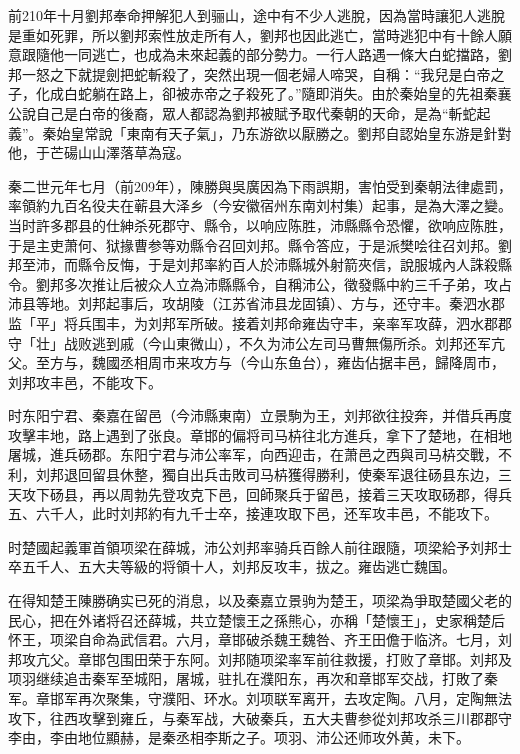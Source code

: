 前210年十月劉邦奉命押解犯人到骊山，途中有不少人逃脫，因為當時讓犯人逃脫是重如死罪，所以劉邦索性放走所有人，劉邦也因此逃亡，當時逃犯中有十餘人願意跟隨他一同逃亡，也成為未來起義的部分勢力。一行人路遇一條大白蛇擋路，劉邦一怒之下就提劍把蛇斬殺了，突然出現一個老婦人啼哭，自稱：“我兒是白帝之子，化成白蛇躺在路上，卻被赤帝之子殺死了。”隨即消失。由於秦始皇的先祖秦襄公說自己是白帝的後裔，眾人都認為劉邦被賦予取代秦朝的天命，是為“斬蛇起義”。秦始皇常說「東南有天子氣」，乃东游欲以厭勝之。劉邦自認始皇东游是針對他，于芒碭山山澤落草為寇。

秦二世元年七月（前209年），陳勝與吳廣因為下雨誤期，害怕受到秦朝法律處罰，率領約九百名役夫在蕲县大泽乡（今安徽宿州东南刘村集）起事，是為大澤之變。当时許多郡县的仕紳杀死郡守、縣令，以响应陈胜，沛縣縣令恐懼，欲响应陈胜，于是主吏萧何、狱掾曹参等劝縣令召回刘邦。縣令答应，于是派樊哙往召刘邦。劉邦至沛，而縣令反悔，于是刘邦率約百人於沛縣城外射箭夾信，說服城內人誅殺縣令。劉邦多次推让后被众人立為沛縣縣令，自稱沛公，徵發縣中約三千子弟，攻占沛县等地。刘邦起事后，攻胡陵（江苏省沛县龙固镇）、方与，还守丰。秦泗水郡监「平」将兵围丰，为刘邦军所破。接着刘邦命雍齿守丰，亲率军攻薛，泗水郡郡守「壮」战败逃到戚（今山東微山），不久为沛公左司马曹無傷所杀。刘邦还军亢父。至方与，魏國丞相周市来攻方与（今山东鱼台），雍齿佔据丰邑，歸降周市，刘邦攻丰邑，不能攻下。

时东阳宁君、秦嘉在留邑（今沛縣東南）立景駒为王，刘邦欲往投奔，并借兵再度攻擊丰地，路上遇到了张良。章邯的偏将司马枿往北方進兵，拿下了楚地，在相地屠城，進兵砀郡。东阳宁君与沛公率军，向西迎击，在萧邑之西與司马枿交戰，不利，刘邦退回留县休整，獨自出兵击敗司马枿獲得勝利，使秦军退往砀县东边，三天攻下砀县，再以周勃先登攻克下邑，回師聚兵于留邑，接着三天攻取砀郡，得兵五、六千人，此时刘邦約有九千士卒，接連攻取下邑，还军攻丰邑，不能攻下。

时楚國起義軍首領项梁在薛城，沛公刘邦率骑兵百餘人前往跟隨，项梁給予刘邦士卒五千人、五大夫等級的将領十人，刘邦反攻丰，拔之。雍齿逃亡魏国。

在得知楚王陳勝确实已死的消息，以及秦嘉立景驹为楚王，项梁為爭取楚國父老的民心，把在外诸将召还薛城，共立楚懷王之孫熊心，亦稱「楚懷王」，史家稱楚后怀王，项梁自命為武信君。六月，章邯破杀魏王魏咎、齐王田儋于临济。七月，刘邦攻亢父。章邯包围田荣于东阿。刘邦随项梁率军前往救援，打败了章邯。刘邦及项羽继续追击秦军至城阳，屠城，驻扎在濮阳东，再次和章邯军交战，打敗了秦军。章邯军再次聚集，守濮阳、环水。刘项联军离开，去攻定陶。八月，定陶無法攻下，往西攻擊到雍丘，与秦军战，大破秦兵，五大夫曹参從刘邦攻杀三川郡郡守李由，李由地位顯赫，是秦丞相李斯之子。项羽、沛公还师攻外黄，未下。


